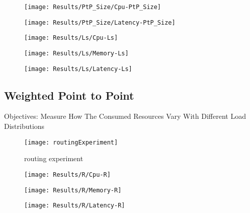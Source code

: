 \begin{figure}[htbp]
    \centering
    \texttt{[image: Results/PtP\_Size/Cpu-PtP\_Size]}
    \label{fig:payloadCpuPtP}
\end{figure}

\begin{figure}[htbp]
    \centering
    \texttt{[image: Results/PtP\_Size/Latency-PtP\_Size]}
    \label{fig:payloadLatPtP}
\end{figure}

\begin{figure}[htbp]
    \centering
    \texttt{[image: Results/Ls/Cpu-Ls]}
    \label{fig:gantt}
\end{figure}

\begin{figure}[htbp]
    \centering
    \texttt{[image: Results/Ls/Memory-Ls]}
    \label{fig:gantt}
\end{figure}

\begin{figure}[htbp]
    \centering
    \texttt{[image: Results/Ls/Latency-Ls]}
    \label{fig:gantt}
\end{figure}

\newpage


\subsection{Weighted Point to Point} %
\label{sec:weighted point to point}

Objectives:
Measure How The Consumed Resources Vary With Different Load Distributions

\begin{figure}[htbp]
    \centering
    \texttt{[image: routingExperiment]}
    \caption{routing experiment}
    \label{fig:gantt}
\end{figure}

\begin{figure}[htbp]
    \centering
    \texttt{[image: Results/R/Cpu-R]}
    \label{fig:gantt}
\end{figure}

\begin{figure}[htbp]
    \centering
    \texttt{[image: Results/R/Memory-R]}
    \label{fig:gantt}
\end{figure}

\begin{figure}[htbp]
    \centering
    \texttt{[image: Results/R/Latency-R]}
    \label{fig:gantt}
\end{figure}

